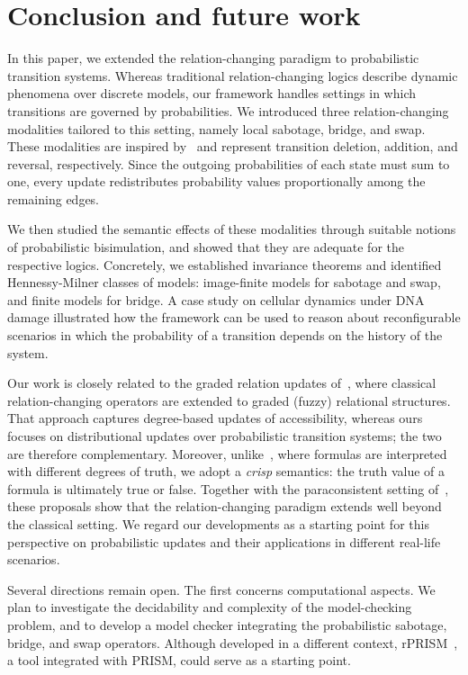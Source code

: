 \section{Conclusion and future work}\label{sec:final}

In this paper, we extended the relation-changing paradigm to probabilistic transition systems. Whereas traditional relation-changing logics describe dynamic phenomena over discrete models, our framework handles settings in which transitions are governed by probabilities. We introduced three relation-changing modalities tailored to this setting, namely local sabotage, bridge, and swap. These modalities are inspired by~\cite{ArecesFH15} and represent transition deletion, addition, and reversal, respectively. Since the outgoing probabilities of each state must sum to one, every update redistributes probability values  proportionally among the remaining edges.

We then studied the semantic effects of these modalities through suitable notions of probabilistic bisimulation, and showed that they are adequate for the respective logics. Concretely, we established invariance theorems and identified Hennessy-Milner classes of models: image-finite models for sabotage and swap, and finite models for bridge. A case study on cellular dynamics under DNA damage illustrated how the framework can be used to reason about reconfigurable scenarios in which the probability of a transition depends on the history of the system.

Our work is closely related to the graded relation updates of~\cite{FFM25}, where classical relation-changing operators are extended to graded (fuzzy) relational structures. That approach captures degree-based updates of accessibility, whereas ours focuses on distributional updates over probabilistic transition systems; the two are therefore complementary. Moreover, unlike~\cite{FFM25}, where formulas are interpreted with different degrees of truth, we adopt a \emph{crisp} semantics: the truth value of a formula is ultimately true or false. Together with the paraconsistent setting of~\cite{CostaFM23}, these proposals show that the relation-changing paradigm extends well beyond the classical setting. We regard our developments as a starting point for this perspective on probabilistic updates and their applications in different real-life scenarios.

Several directions remain open. The first concerns computational aspects. We plan to investigate the decidability and complexity of the model-checking problem, and to develop a  model checker integrating the probabilistic sabotage, bridge, and swap operators. Although developed in a different context, rPRISM~\cite{FRMC19}, a tool integrated with PRISM, could serve as a starting point.

